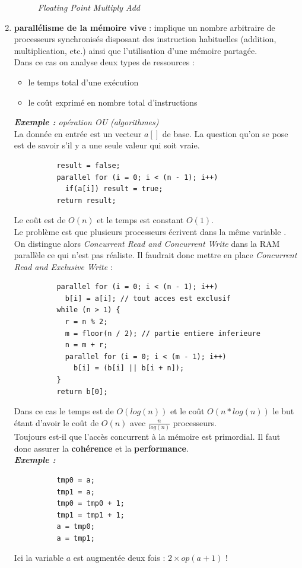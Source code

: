 \documentclass[12pt, a4paper]{article}
\begin{document}
\begin{enumerate}
\begin{figure}[!ht]
          \caption{\textit{Floating Point Multiply Add}}
          \label{fig:mdistr}
        \end{figure}
        \item \textbf{parallélisme de la mémoire vive} : implique un nombre
        arbitraire de processeurs synchronisés disposant des instruction
        habituelles (addition, multiplication, etc.) ainsi que l'utilisation
        d'une mémoire partagée. \\
        Dans ce cas on analyse deux types de ressources :
        \begin{itemize}
          \item le temps total d'une exécution
          \item le coût exprimé en nombre total d'instructions
        \end{itemize}
        \textit{\textbf{Exemple :} opération OU (algorithmes)} \\
        La donnée en entrée est un vecteur $a[]$ de base. La question qu'on se
        pose est de savoir s'il y a une seule valeur qui soit vraie. \\
        \begin{lstlisting}
          result = false;
          parallel for (i = 0; i < (n - 1); i++)
            if(a[i]) result = true;
          return result;
        \end{lstlisting}
        Le coût est de $O(n)$ et le temps est constant $O(1)$. \\
        Le problème est que plusieurs processeurs écrivent dans la même variable
        . On distingue alors \textit{Concurrent Read and Concurrent Write} dans
        la RAM parallèle ce qui n'est pas réaliste. Il faudrait donc mettre en
        place \textit{Concurrent Read and Exclusive Write} :
        \begin{lstlisting}
          parallel for (i = 0; i < (n - 1); i++)
            b[i] = a[i]; // tout acces est exclusif
          while (n > 1) {
            r = n % 2;
            m = floor(n / 2); // partie entiere inferieure
            n = m + r;
            parallel for (i = 0; i < (m - 1); i++)
              b[i] = (b[i] || b[i + n]);
          }
          return b[0];
        \end{lstlisting}
        Dans ce cas le temps est de $O(log(n))$ et le coût $O(n * log(n))$ le
        but étant d'avoir le coût de $O(n)$ avec $\frac{n}{log(n)}$ processeurs.
         \\
        Toujours est-il que l'accès concurrent à la mémoire est primordial. Il
        faut donc assurer la \textbf{cohérence} et la \textbf{performance}. \\
        \textit{\textbf{Exemple :}}
        \begin{lstlisting}
          tmp0 = a;
          tmp1 = a;
          tmp0 = tmp0 + 1;
          tmp1 = tmp1 + 1;
          a = tmp0;
          a = tmp1;
        \end{lstlisting}
        Ici la variable $a$ est augmentée deux fois : $2 \times op(a + 1)$ !
      \end{enumerate}
\end{document}

